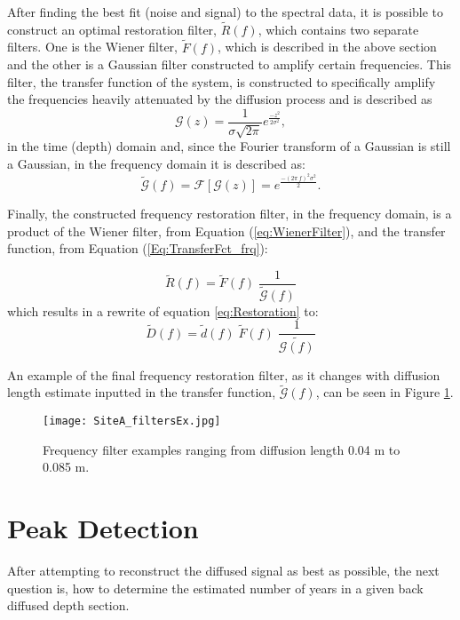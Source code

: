 \documentclass[../../CompleteThesis2/Complete_2ndDraft]{subfiles}
\begin{document}
After finding the best fit (noise and signal) to the spectral data, it is possible to construct an optimal restoration filter, $\tilde{R}(f)$, which contains two separate filters. One is the Wiener filter, $\tilde{F}(f)$, which is described in the above section and the other is a Gaussian filter constructed to amplify certain frequencies. This filter, the transfer function of the system, is constructed to specifically amplify the frequencies heavily attenuated by the diffusion process and is described as
\begin{equation}
	\mathcal{G}(z) = \frac{1}{\sigma\sqrt{2\pi}} e^{\frac{-z^2}{2\sigma^2}},
	\label{Eq:TransferFct_z}
\end{equation}
in the time (depth) domain and, since the Fourier transform of a Gaussian is still a Gaussian, in the frequency domain it is described as:
\begin{equation}
	\tilde{\mathcal{G}}(f) = \mathcal{F}[\mathcal{G}(z)] = e^{\frac{-(2\pi\, f)^2\sigma^2}{2}}.
	\label{Eq:TransferFct_frq}
\end{equation}

Finally, the constructed frequency restoration filter, in the frequency domain, is a product of the Wiener filter, from Equation (\ref{eq:WienerFilter}), and the transfer function, from Equation (\ref{Eq:TransferFct_frq}):

\begin{equation}
	\tilde{R}(f) =  \tilde{F}(f) \;\frac{1}{\tilde{\mathcal{G}}(f)}
\end{equation}
which results in a rewrite of equation \ref{eq:Restoration} to:
\begin{equation}
	\tilde{D}(f) = \tilde{d}(f)\;\tilde{F}(f)\;\frac{1}{\tilde{\mathcal{G}(f)}}
\end{equation}

An example of the final frequency restoration filter, as it changes with diffusion length estimate inputted in the transfer function, $\tilde{\mathcal{G}}(f)$, can be seen in Figure \ref{fig:SiteA_filtersEx}.

\begin{figure}[h]
	\centering
	\texttt{[image: SiteA\_filtersEx.jpg]}
	\caption[Frequency filters example, Site A]{\small Frequency filter examples ranging from diffusion length 0.04 m to 0.085 m.}
	\label{fig:SiteA_filtersEx}
\end{figure}


\section[Peak Detection]{Peak Detection}
\label{Sec:CompMeths_PeakDetection}
After attempting to reconstruct the diffused signal as best as possible, the next question is, how to determine the estimated number of years in a given back diffused depth section.
\end{document}
